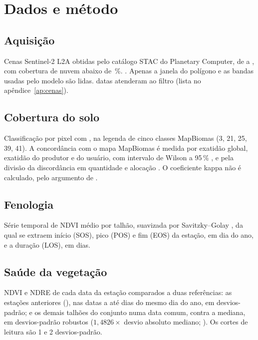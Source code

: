 \documentclass[11pt,a4paper]{article}
\begin{document}
\section{Dados e método}

\subsection{Aquisição}
Cenas Sentinel-2 L2A obtidas pelo catálogo STAC do Planetary Computer, de
 a , com cobertura de nuvem abaixo de
\,\%. . Apenas a janela do polígono e as
bandas usadas pelo modelo são lidas.  datas atenderam ao
filtro (lista no apêndice~\ref{ap:cenas}).

\subsection{Cobertura do solo}
Classificação por pixel com , na legenda de cinco classes
MapBiomas (3, 21, 25, 39, 41). A concordância com o mapa MapBiomas
\citep{souza2020} é medida por exatidão global, exatidão do produtor e do
usuário, com intervalo de Wilson a 95\,\% \citep{brown2001}, e pela divisão da
discordância em quantidade e alocação \citep{pontius2011}. O coeficiente kappa
não é calculado, pelo argumento de \citet{pontius2011}.

\subsection{Fenologia}
Série temporal de NDVI médio por talhão, suavizada por Savitzky--Golay
\citep{savitzky1964}, da qual se extraem início (SOS), pico (POS) e fim (EOS)
da estação, em dia do ano, e a duração (LOS), em dias.

\subsection{Saúde da vegetação}
NDVI e NDRE de cada data da estação comparados a duas referências: as
estações anteriores (), nas datas a até
 dias do mesmo dia do ano, em desvios-padrão; e os
demais talhões do conjunto numa data comum, contra a mediana, em
desvios-padrão robustos ($1{,}4826 \times$ desvio absoluto mediano;
\citealp{rousseeuw1993}). Os cortes de leitura são 1 e 2 desvios-padrão.
\end{document}
